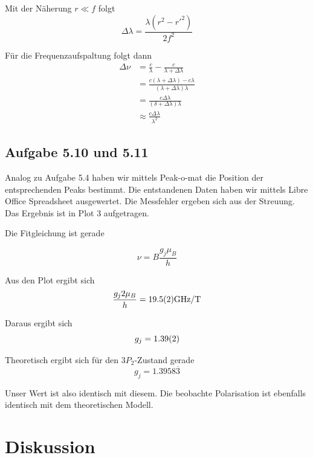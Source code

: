 \documentclass[a4paper,german,12pt,smallheadings]{scrartcl}
\begin{document}
Mit der Näherung $r \ll f$ folgt
\begin{equation}
  \Delta \lambda = \frac{\lambda(r^2 - r'^2)}{2f^2}
\end{equation}

Für die Frequenzaufspaltung folgt dann
\begin{align*}
  \Delta \nu &= \frac{c}{\lambda} - \frac{c}{\lambda + \Delta \lambda} \\
             &= \frac{c(\lambda + \Delta \lambda) - c\lambda}{(\lambda + \Delta \lambda) \lambda} \\
             &= \frac{c \Delta \lambda}{(\delta + \Delta \lambda)\lambda} \\
             &\approx \frac{c \Delta \lambda}{\lambda^2}
\end{align*}

\subsection{Aufgabe 5.10 und 5.11}

Analog zu Aufgabe 5.4 haben wir mittels Peak-o-mat die Position der
entsprechenden Peaks bestimmt. Die entstandenen Daten haben wir mittels Libre
Office Spreadsheet ausgewertet. Die Messfehler ergeben sich aus der Streuung.
Das Ergebnis ist in Plot 3 aufgetragen.

Die Fitgleichung ist gerade

\begin{equation}
  \nu = B \frac{g_j \mu_B}{h}
\end{equation}

Aus den Plot ergibt sich
\begin{equation}
  \frac{g_j 2 \mu_B}{h} = \num{19.5+-0.2} \text{GHz}/\text{T}
\end{equation}

Daraus ergibt sich
\begin{equation}
  g_j = \num{1.39+-0.02}
\end{equation}

Theoretisch ergibt sich für den $3P_2$-Zustand gerade
\begin{equation}
  g_j = 1.3958\overline{3}
\end{equation}

Unser Wert ist also identisch mit diesem. Die beobachte Polarisation ist
ebenfalls identisch mit dem theoretischen Modell.

\section{Diskussion}
\end{document}
